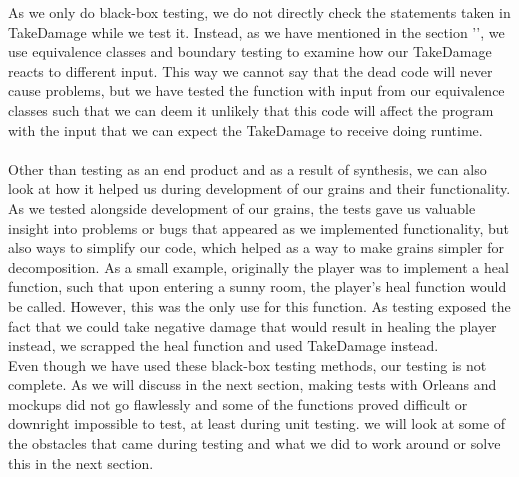 As we only do black-box testing, we do not directly check the statements taken in TakeDamage while we test it. Instead, as we have mentioned in the section '', we use equivalence classes and boundary testing to examine how our TakeDamage reacts to different input. This way we cannot say that the dead code will never cause problems, but we have tested the function with input from our equivalence classes such that we can deem it unlikely that this code will affect the program with the input that we can expect the TakeDamage to receive doing runtime. \\ \\
Other than testing as an end product and as a result of synthesis, we can also look at how it helped us during development of our grains and their functionality. As we tested alongside development of our grains, the tests gave us valuable insight into problems or bugs that appeared as we implemented functionality, but also ways to simplify our code, which helped as a way to make grains simpler for decomposition. As a small example, originally the player was to implement a heal function, such that upon entering a sunny room, the player's heal function would be called. However, this was the only use for this function. As testing exposed the fact that we could take negative damage that would result in healing the player instead, we scrapped the heal function and used TakeDamage instead. \\
Even though we have used these black-box testing methods, our testing is not complete. As we will discuss in the next section, making tests with Orleans and mockups did not go flawlessly and some of the functions proved difficult or downright impossible to test, at least during unit testing. we will look at some of the obstacles that came during testing and what we did to work around or solve this in the next section. 